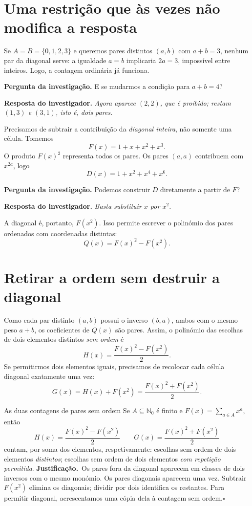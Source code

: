 \documentclass[11pt,a4paper,oneside]{book}
\newcommand{\Pergunta}[1]{\begin{perguntabox}\textbf{Pergunta da investigação.} #1\end{perguntabox}}
\newcommand{\Resposta}[1]{\textcolor{verdeescuro}{\textbf{Resposta do investigador.}} \emph{#1}\par}
\newcommand{\prova}{\textbf{Justificação.}\ }
\newcommand{\fimprova}{\hfill$\square$}
\newcommand{\Nzero}{\mathbb{N}_0}
\begin{document}
\section{Uma restrição que às vezes não modifica a resposta}
Se $A=B=\{0,1,2,3\}$ e queremos pares distintos $(a,b)$ com $a+b=3$, nenhum par da diagonal serve: a igualdade $a=b$ implicaria $2a=3$, impossível entre inteiros. Logo, a contagem ordinária já funciona.
\Pergunta{E se mudarmos a condição para $a+b=4$?}
\Resposta{Agora aparece $(2,2)$, que é proibido; restam $(1,3)$ e $(3,1)$, isto é, dois pares.}
Precisamos de subtrair a contribuição da \emph{diagonal inteira}, não somente uma célula. Tomemos
\[F(x)=1+x+x^2+x^3.\]
O produto $F(x)^2$ representa todos os pares. Os pares $(a,a)$ contribuem com $x^{2a}$, logo
\[D(x)=1+x^2+x^4+x^6.\]
\Pergunta{Podemos construir $D$ diretamente a partir de $F$?}
\Resposta{Basta substituir $x$ por $x^2$.}
A diagonal é, portanto, $F(x^2)$. Isso permite escrever o polinómio dos pares ordenados com coordenadas distintas:
\[Q(x)=F(x)^2-F(x^2).\]
\section{Retirar a ordem sem destruir a diagonal}
Como cada par distinto $(a,b)$ possui o inverso $(b,a)$, ambos com o mesmo peso $a+b$, os coeficientes de $Q(x)$ são pares. Assim, o polinómio das escolhas de dois elementos distintos \emph{sem ordem} é
\[H(x)=\frac{F(x)^2-F(x^2)}{2}.\]
Se permitirmos dois elementos iguais, precisamos de recolocar cada célula diagonal exatamente uma vez:
\[
G(x)=H(x)+F(x^2)=\frac{F(x)^2+F(x^2)}2.
\]
\begin{teoremabox}{As duas contagens de pares sem ordem}
Se $A\subseteq\Nzero$ é finito e $F(x)=\sum_{a\in A}x^a$, então
\[
\boxed{H(x)=\frac{F(x)^2-F(x^2)}2}\qquad
\boxed{G(x)=\frac{F(x)^2+F(x^2)}2}
\]
contam, por soma dos elementos, respetivamente: escolhas sem ordem de dois elementos \emph{distintos}; escolhas sem ordem de dois elementos \emph{com repetição permitida}.
\prova Os pares fora da diagonal aparecem em classes de dois inversos com o mesmo monómio. Os pares diagonais aparecem uma vez. Subtrair $F(x^2)$ elimina os diagonais; dividir por dois identifica os restantes. Para permitir diagonal, acrescentamos uma cópia dela à contagem sem ordem.\fimprova
\end{teoremabox}
\begin{center}
\end{center}
\end{document}
